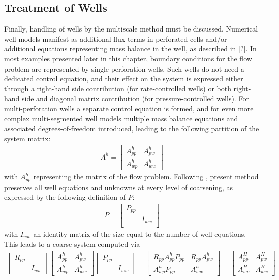 \subsection{Treatment of Wells}
\label{subsec:coupled_wells}

Finally, handling of wells by the multiscale method must be discussed.   Numerical well models manifest as additional flux terms in perforated cells and/or additional equations representing mass balance in the well, as described in \autoref{?}.   In most examples presented later in this chapter, boundary conditions for the flow problem are represented by single perforation wells.   Such wells do not need a dedicated control equation, and their effect on the system is expressed either through a right-hand side contribution (for rate-controlled wells) or both right-hand side and diagonal matrix contribution (for pressure-controlled wells).   For multi-perforation wells a separate control equation is formed, and for even more complex multi-segmented well models multiple mass balance equations and associated degrees-of-freedom introduced, leading to the following partition of the system matrix:
\begin{align}
    A^h =
    \begin{bmatrix}
        A_{pp}^h & A_{pw}^h \\
        A_{wp}^h & A_{ww}^h
    \end{bmatrix}
\end{align}
with $A_{pp}^h$ representing the matrix of the flow problem.   Following \cite{Moyner2016}, present method preserves all well equations and unknowns at every level of coarsening, as expressed by the following definition of $P$:
\begin{align}
    P =
    \begin{bmatrix}
        P_{pp} &        \\
               & I_{ww} \\
    \end{bmatrix}
\end{align}
with $I_{ww}$ an identity matrix of the size equal to the number of well equations.   This leads to a coarse system computed via
\begin{align}
    \begin{bmatrix}
		R_{pp} &       \\
		       & I_{ww}
	\end{bmatrix}
	\begin{bmatrix}
		A_{pp}^h & A_{pw}^h \\
		A_{wp}^h & A_{ww}^h
	\end{bmatrix}
	\begin{bmatrix}
	    P_{pp} &       \\
		       & I_{ww}
	\end{bmatrix} =
	\begin{bmatrix}
	    R_{pp} A_{pp}^h P_{pp}   & R_{pp} A_{pw}^h \\
	    A_{wp}^h P_{pp} & A_{ww}^h
	\end{bmatrix} =
	\begin{bmatrix}
		A_{pp}^H & A_{pw}^H \\
		A_{wp}^H & A_{ww}^H
	\end{bmatrix}
\end{align}
